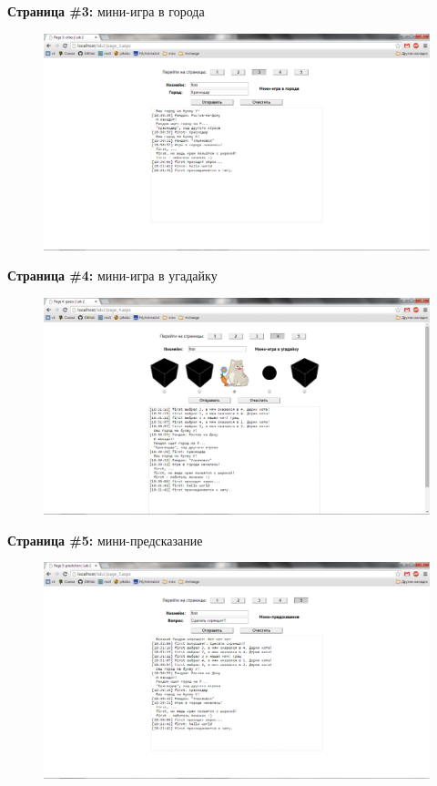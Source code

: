 \documentclass[pscyr]{hedlab}
\begin{document}
  \newpage
  
  \textbf{Страница \#3:} мини-игра в города
  \begin{figure}[h!]
    \center
    \includegraphics[width=.95\textwidth]{03}
  \end{figure}
  
  
  \textbf{Страница \#4:} мини-игра в угадайку
  \begin{figure}[h!]
    \center
    \includegraphics[width=.95\textwidth]{04}
  \end{figure}
  
  
  \newpage
  
  \textbf{Страница \#5:} мини-предсказание
  \begin{figure}[h!]
    \center
    \includegraphics[width=.95\textwidth]{05}
  \end{figure}
  
  
\end{document}
